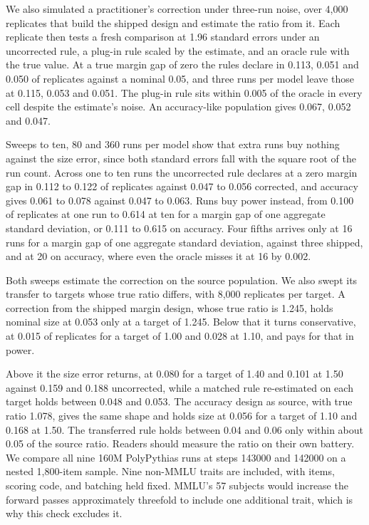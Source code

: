 We also simulated a practitioner's correction under three-run noise, over 4,000 replicates that build the shipped design and estimate the ratio from it. Each replicate then tests a fresh comparison at 1.96 standard errors under an uncorrected rule, a plug-in rule scaled by the estimate, and an oracle rule with the true value. At a true margin gap of zero the rules declare in 0.113, 0.051 and 0.050 of replicates against a nominal 0.05, and three runs per model leave those at 0.115, 0.053 and 0.051. The plug-in rule sits within 0.005 of the oracle in every cell despite the estimate's noise. An accuracy-like population gives 0.067, 0.052 and 0.047.

Sweeps to ten, 80 and 360 runs per model show that extra runs buy nothing against the size error, since both standard errors fall with the square root of the run count. Across one to ten runs the uncorrected rule declares at a zero margin gap in 0.112 to 0.122 of replicates against 0.047 to 0.056 corrected, and accuracy gives 0.061 to 0.078 against 0.047 to 0.063. Runs buy power instead, from 0.100 of replicates at one run to 0.614 at ten for a margin gap of one aggregate standard deviation, or 0.111 to 0.615 on accuracy. Four fifths arrives only at 16 runs for a margin gap of one aggregate standard deviation, against three shipped, and at 20 on accuracy, where even the oracle misses it at 16 by 0.002.

Both sweeps estimate the correction on the source population. We also swept its transfer to targets whose true ratio differs, with 8,000 replicates per target. A correction from the shipped margin design, whose true ratio is 1.245, holds nominal size at 0.053 only at a target of 1.245. Below that it turns conservative, at 0.015 of replicates for a target of 1.00 and 0.028 at 1.10, and pays for that in power.

Above it the size error returns, at 0.080 for a target of 1.40 and 0.101 at 1.50 against 0.159 and 0.188 uncorrected, while a matched rule re-estimated on each target holds between 0.048 and 0.053. The accuracy design as source, with true ratio 1.078, gives the same shape and holds size at 0.056 for a target of 1.10 and 0.168 at 1.50. The transferred rule holds between 0.04 and 0.06 only within about 0.05 of the source ratio. Readers should measure the ratio on their own battery.
We compare all nine 160M PolyPythias runs at steps 143000 and 142000 on a nested 1,800-item sample. Nine non-MMLU traits are included, with items, scoring code, and batching held fixed. MMLU's 57 subjects would increase the forward passes approximately threefold to include one additional trait, which is why this check excludes it.

